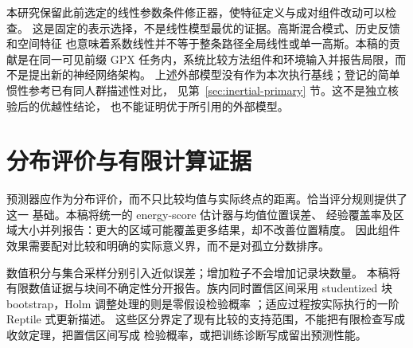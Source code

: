本研究保留此前选定的线性参数条件修正器，使特征定义与成对组件改动可以检查。
这是固定的表示选择，不是线性模型最优的证据。高斯混合模式、历史反馈和空间特征
也意味着系数线性并不等于整条路径全局线性或单一高斯。本稿的贡献是在同一可见前缀
GPX 任务内，系统比较方法组件和环境输入并报告局限，而不是提出新的神经网络架构。
上述外部模型没有作为本次执行基线；登记的简单惯性参考已有同人群描述性对比，
见第~\ref{sec:inertial-primary} 节。这不是独立核验后的优越性结论，
也不能证明优于所引用的外部模型。


\section{分布评价与有限计算证据}
预测器应作为分布评价，而不只比较均值与实际终点的距离。恰当评分规则提供了这一
基础\cite{gneiting2007,gneiting2008}。本稿将统一的 energy-score 估计器与均值位置误差、
经验覆盖率及区域大小并列报告：更大的区域可能覆盖更多结果，却不改善位置精度。
因此组件效果需要配对比较和明确的实际意义界，而不是对孤立分数排序。

数值积分与集合采样分别引入近似误差\cite{kloeden1992}；增加粒子不会增加记录块数量。
本稿将有限数值证据与块间不确定性分开报告。族内同时置信区间采用 studentized
块 bootstrap\cite{davison1997}，Holm 调整处理的则是零假设检验概率
\cite{holm1979}；适应过程按实际执行的一阶 Reptile 式更新描述\cite{nichol2018}。
这些区分界定了现有比较的支持范围，不能把有限检查写成收敛定理，把置信区间写成
检验概率，或把训练诊断写成留出预测性能。


